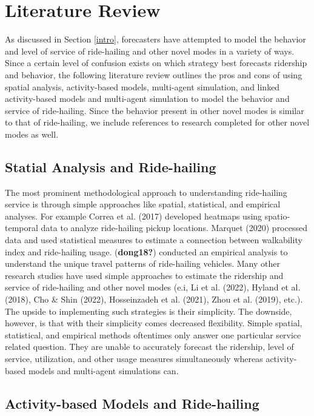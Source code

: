 \documentclass[fancy, masters]{byuthesis}
\begin{document}
\hypertarget{lit}{%
\chapter{Literature Review}\label{lit}}

As discussed in Section \ref{intro}, forecasters have attempted to model the behavior and level of service of ride-hailing and other novel modes in a variety of ways. Since a certain level of confusion exists on which strategy best forecasts ridership and behavior, the following literature review outlines the pros and cons of using spatial analysis, activity-based models, multi-agent simulation, and linked activity-based models and multi-agent simulation to model the behavior and service of ride-hailing. Since the behavior present in other novel modes is similar to that of ride-hailing, we include references to research completed for other novel modes as well.

\hypertarget{lit-simp}{%
\section{Statial Analysis and Ride-hailing}\label{lit-simp}}

The most prominent methodological approach to understanding ride-hailing service is through simple approaches like spatial, statistical, and empirical analyses. For example Correa et al. (2017) developed heatmaps using spatio-temporal data to analyze ride-hailing pickup locations. Marquet (2020) processed data and used statistical measures to estimate a connection between walkability index and ride-hailing usage. (\textbf{dong18?}) conducted an empirical analysis to understand the unique travel patterns of ride-hailing vehicles. Many other research studies have used simple approaches to estimate the ridership and service of ride-hailing and other novel modes (e.i, Li et al. (2022), Hyland et al. (2018), Cho \& Shin (2022), Hosseinzadeh et al. (2021), Zhou et al. (2019), etc.). The upside to implementing such strategies is their simplicity. The downside, however, is that with their simplicity comes decreased flexibility. Simple spatial, statistical, and empirical methods oftentimes only answer one particular service related question. They are unable to accurately forecast the ridership, level of service, utilization, and other usage measures simultaneously whereas activity-based models and multi-agent simulations can.

\hypertarget{lit-abm}{%
\section{Activity-based Models and Ride-hailing}\label{lit-abm}}
\end{document}
